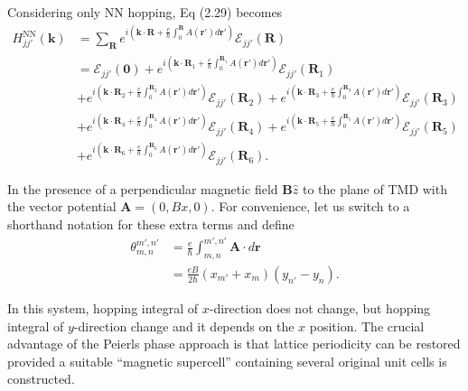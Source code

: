 \documentclass{report}
\begin{document}
Considering only \ac{NN} hopping, Eq (2.29) becomes
\begin{equation}
	\begin{aligned}
		H_{jj'}^{\text{NN}}(\mathbf{k})
		 & = \sum_{\mathbf{R}} e^{i(\mathbf{k\cdot R} + \frac{e}{\hbar}\int_{0}^{\mathbf{R}}A(\mathbf{r'})d\mathbf{r'})} \mathcal{E}_{jj'}(\mathbf{R})                                                                                                                                                  \\
		 & = \mathcal{E}_{jj'}(\mathbf{0}) + e^{i(\mathbf{k\cdot}\mathbf{R}_{1} + \frac{e}{\hbar}\int_{0}^{\mathbf{R}_{1}}A(\mathbf{r'})d\mathbf{r'})} \mathcal{E}_{jj'}(\mathbf{R}_{1})                                                                                                                \\
		 & + e^{i(\mathbf{k\cdot} \mathbf{R}_{2} + \frac{e}{\hbar}\int_{0}^{\mathbf{R}_{2}}A(\mathbf{r'})d\mathbf{r'})} \mathcal{E}_{jj'}(\mathbf{R}_{2}) + e^{i(\mathbf{k\cdot}\mathbf{R}_{3} + \frac{e}{\hbar}\int_{0}^{\mathbf{R}_{3}}A(\mathbf{r'})d\mathbf{r'})} \mathcal{E}_{jj'}(\mathbf{R}_{3}) \\
		 & + e^{i(\mathbf{k\cdot}\mathbf{R}_{4} + \frac{e}{\hbar}\int_{0}^{\mathbf{R}_{4}}A(\mathbf{r'})d\mathbf{r'})} \mathcal{E}_{jj'}(\mathbf{R}_{4}) + e^{i(\mathbf{k\cdot}\mathbf{R}_{5} + \frac{e}{\hbar}\int_{0}^{\mathbf{R}_{5}}A(\mathbf{r'})d\mathbf{r'})} \mathcal{E}_{jj'}(\mathbf{R}_{5})  \\
		 & + e^{i(\mathbf{k\cdot}\mathbf{R}_{6} + \frac{e}{\hbar}\int_{0}^{\mathbf{R}_{6}}A(\mathbf{r'})d\mathbf{r'})} \mathcal{E}_{jj'}(\mathbf{R}_{6}).
	\end{aligned}
\end{equation}

In the presence of a perpendicular magnetic field $\mathbf{B} \hat{z}$ to the plane of TMD with the vector potential $\mathbf{A} = (0, Bx, 0)$. For convenience, let us switch to a shorthand notation for these extra terms and define
\begin{equation}
	\begin{aligned}
		\theta_{m,n}^{m',n'}
		 & = \frac{e}{\hbar} \int_{m,n}^{m',n'} \mathbf{A} \cdot d\mathbf{r} \\
		 & = \frac{eB}{2\hbar}(x_{m'} + x_{m})(y_{n'} - y_{n}).
	\end{aligned}
\end{equation}

In this system, hopping integral of $x$-direction does not change, but hopping integral of $y$-direction change and it depends on the $x$ position. The crucial advantage of the Peierls phase approach is that lattice periodicity can be restored provided a suitable ``magnetic supercell'' containing several original unit cells is constructed.
\end{document}
